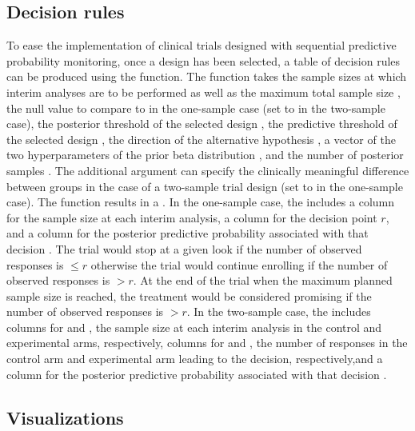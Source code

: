 \hypertarget{decision-rules}{%
\subsection{Decision rules}\label{decision-rules}}

To ease the implementation of clinical trials designed with sequential
predictive probability monitoring, once a design has been selected, a
table of decision rules can be produced using the
 function. The function takes the sample
sizes  at which interim analyses are to be performed as well as
the maximum total sample size , the null value to compare to in
the one-sample case  (set to  in the two-sample
case), the posterior threshold of the selected design , the
predictive threshold of the selected design , the direction of
the alternative hypothesis , a vector of the two
hyperparameters of the prior beta distribution , and the
number of posterior samples . The additional argument
 can specify the clinically meaningful difference between
groups in the case of a two-sample trial design (set to  in
the one-sample case). The function results in a . In the
one-sample case, the  includes a column for the sample size
 at each interim analysis, a column for the decision point
\(r\), and a column for the posterior predictive probability associated
with that decision . The trial would stop at a given look if
the number of observed responses is \(\leq r\) otherwise the trial would
continue enrolling if the number of observed responses is \(>r\). At the
end of the trial when the maximum planned sample size is reached, the
treatment would be considered promising if the number of observed
responses is \(>r\). In the two-sample case, the  includes
columns for  and , the sample size at each interim
analysis in the control and experimental arms, respectively, columns for
 and , the number of responses in the control arm and
experimental arm leading to the decision, respectively,and a column for
the posterior predictive probability associated with that decision
.

\hypertarget{visualizations}{%
\subsection{Visualizations}\label{visualizations}}

